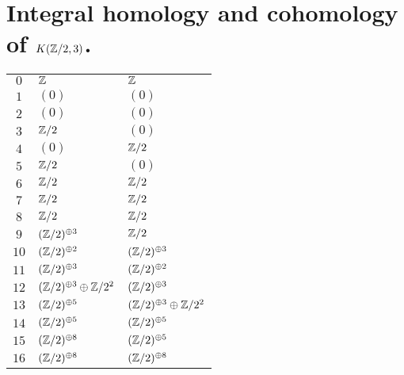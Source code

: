 \section{Integral homology and cohomology of $K(\mathbb{Z}/2,3)$.}\label{A:integral homology of K(Z/2,3)}
\tablelasttail{\hline}
\begin{supertabular}{|c|p{5.5cm}|p{5.5cm}|}
$0$%
&$\mathbb{Z}$%
&$\mathbb{Z}$\\

$1$%
&$(0)$%
&$(0)$\\

$2$%
&$(0)$%
&$(0)$\\

$3$%
&$\mathbb{Z}/2$%
&$(0)$\\

$4$%
&$(0)$%
&$\mathbb{Z}/2$\\

$5$%
&$\mathbb{Z}/2$%
&$(0)$\\

$6$%
&$\mathbb{Z}/2$%
&$\mathbb{Z}/2$\\

$7$%
&$\mathbb{Z}/2$%
&$\mathbb{Z}/2$\\

$8$%
&$\mathbb{Z}/2$%
&$\mathbb{Z}/2$\\

$9$%
&$(\mathbb{Z}/2)^{\oplus3}$%
&$\mathbb{Z}/2$\\

$10$%
&$(\mathbb{Z}/2)^{\oplus2}$%
&$(\mathbb{Z}/2)^{\oplus3}$\\

$11$%
&$(\mathbb{Z}/2)^{\oplus3}$%
&$(\mathbb{Z}/2)^{\oplus2}$\\

$12$%
&$(\mathbb{Z}/2)^{\oplus3}\oplus\mathbb{Z}/2^{2}$%
&$(\mathbb{Z}/2)^{\oplus3}$\\

$13$%
&$(\mathbb{Z}/2)^{\oplus5}$%
&$(\mathbb{Z}/2)^{\oplus3}\oplus\mathbb{Z}/2^{2}$\\

$14$%
&$(\mathbb{Z}/2)^{\oplus5}$%
&$(\mathbb{Z}/2)^{\oplus5}$\\

$15$%
&$(\mathbb{Z}/2)^{\oplus8}$%
&$(\mathbb{Z}/2)^{\oplus5}$\\

$16$%
&$(\mathbb{Z}/2)^{\oplus8}$%
&$(\mathbb{Z}/2)^{\oplus8}$\\


\end{supertabular}
